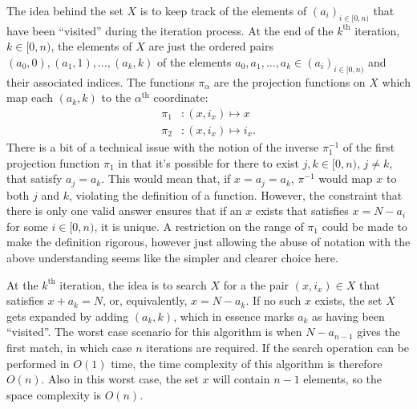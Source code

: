 The idea behind the set $X$ is to keep track of the elements of $(a_i)_{i \in [0, n)}$ that have been ``visited'' during the iteration process. At the end of the $k^{\text{th}}$ iteration, $k \in [0, n)$, the elements of $X$ are just the ordered pairs $(a_0, 0), (a_1, 1), \ldots, (a_k, k)$ of the elements $a_0, a_1, \ldots, a_k \in (a_i)_{i \in [0, n)}$ and their associated indices. The functions $\pi_{\alpha}$ are the projection functions on $X$ which map each $(a_k, k)$ to the $\alpha^{\text{th}}$ coordinate:
\begin{align*}
  \pi_1 &: (x, i_x) \mapsto x \\
  \pi_2 &: (x, i_x) \mapsto i_x.
\end{align*}
There is a bit of a technical issue with the notion of the inverse $\pi_1^{-1}$ of the first projection function $\pi_1$ in that it's possible for there to exist $j, k \in [0, n)$, $j \neq k$, that satisfy $a_j = a_k$. This would mean that, if $x = a_j = a_k$, $\pi^{-1}$ would map $x$ to both $j$ and $k$, violating the definition of a function. However, the constraint that there is only one valid answer ensures that if an $x$ exists that satisfies $x = N - a_i$ for some $i \in [0, n)$, it is unique. A restriction on the range of $\pi_1$ could be made to make the definition rigorous, however just allowing the abuse of notation with the above understanding seems like the simpler and clearer choice here.

At the $k^{\text{th}}$ iteration, the idea is to search $X$ for a the pair $(x, i_x) \in X$ that satisfies $x + a_k = N$, or, equivalently, $x = N - a_k$. If no such $x$ exists, the set $X$ gets expanded by adding $(a_k, k)$, which in essence marks $a_k$ as having been ``visited''. The worst case scenario for this algorithm is when $N - a_{n - 1}$ gives the first match, in which case $n$ iterations are required. If the search operation can be performed in $O(1)$ time, the time complexity of this algorithm is therefore $O(n)$. Also in this worst case, the set $x$ will contain $n - 1$ elements, so the space complexity is $O(n)$.


\clearpage
